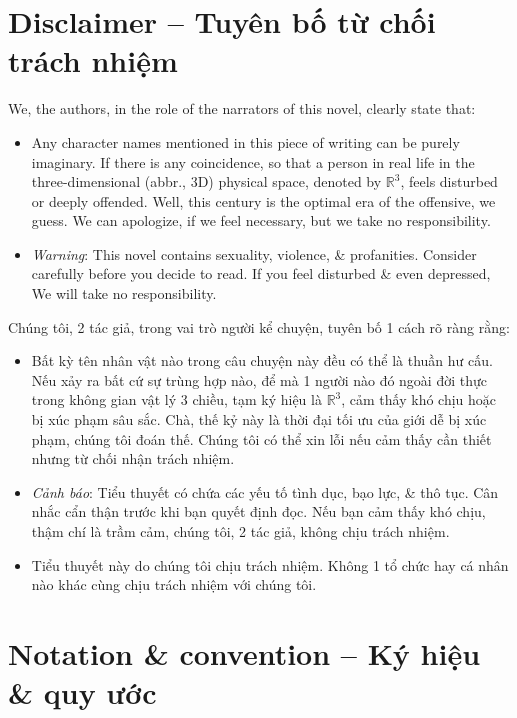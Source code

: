 \documentclass[12pt,oneside]{book}
\begin{document}
\section{Disclaimer -- Tuyên bố từ chối trách nhiệm}
We, the authors, in the role of the narrators of this novel, clearly state that:
\begin{itemize}
	\item Any character names mentioned in this piece of writing can be purely imaginary. If there is any coincidence, so that a person in real life in the three-dimensional (abbr., 3D) physical space, denoted by $\mathbb{R}^3$, feels disturbed or deeply offended. Well, this century is the optimal era of the offensive, we guess. We can apologize, if we feel necessary, but we take no responsibility.
	\item {\it Warning}: This novel contains sexuality, violence, \& profanities. Consider carefully before you decide to read. If you feel disturbed \& even depressed, We will take no responsibility.
\end{itemize}
Chúng tôi, 2 tác giả, trong vai trò người kể chuyện, tuyên bố 1 cách rõ ràng rằng:
\begin{itemize}
	\item Bất kỳ tên nhân vật nào trong câu chuyện này đều có thể là thuần hư cấu. Nếu xảy ra bất cứ sự trùng hợp nào, để mà 1 người nào đó ngoài đời thực trong không gian vật lý 3 chiều, tạm ký hiệu là $\mathbb{R}^3$, cảm thấy khó chịu hoặc bị xúc phạm sâu sắc. Chà, thế kỷ này là thời đại tối ưu của giới dễ bị xúc phạm, chúng tôi đoán thế. Chúng tôi có thể xin lỗi nếu cảm thấy cần thiết nhưng từ chối nhận trách nhiệm.
	\item {\it Cảnh báo}: Tiểu thuyết có chứa các yếu tố tình dục, bạo lực, \& thô tục. Cân nhắc cẩn thận trước khi bạn quyết định đọc. Nếu bạn cảm thấy khó chịu, thậm chí là trầm cảm, chúng tôi, 2 tác giả, không chịu trách nhiệm.
	\item Tiểu thuyết này do chúng tôi chịu trách nhiệm. Không 1 tổ chức hay cá nhân nào khác cùng chịu trách nhiệm với chúng tôi.
\end{itemize}

\section{Notation \& convention -- Ký hiệu \& quy ước}
\end{document}
